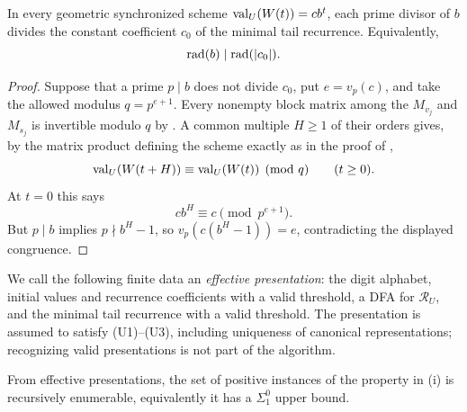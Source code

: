 \begin{lemma}
  \label{lem:geometric-ratio-tail-support}
  In every geometric synchronized scheme
  \(\operatorname{val}_U(W(t))=cb^t\), each prime divisor of \(b\) divides the
  constant coefficient \(c_0\) of the minimal tail recurrence.  Equivalently,
  \[
    \operatorname{rad}(b)\mid\operatorname{rad}(\lvert c_0 \rvert).
  \]
\end{lemma}

\begin{proof}
  Suppose that a prime \(p\mid b\) does not divide \(c_0\), put
  \(e=v_p(c)\), and take the allowed modulus \(q=p^{e+1}\).  Every
  nonempty block matrix among the \(M_{v_j}\) and \(M_{s_j}\) is invertible
  modulo \(q\) by .  A common
  multiple \(H\ge1\) of their orders gives, by the matrix product defining
  the scheme exactly as in the proof of
  ,
  \[
    \operatorname{val}_U(W(t+H))\equiv\operatorname{val}_U(W(t))\pmod q
    \qquad(t\ge0).
  \]
  At \(t=0\) this says
  \[
    cb^H\equiv c\pmod {p^{e+1}}.
  \]
  But \(p\mid b\) implies \(p\nmid b^H-1\), so
  \(v_p(c(b^H-1))=e\), contradicting the displayed congruence.
\end{proof}

We call the following finite data an \emph{effective presentation}: the
digit alphabet, initial values and recurrence coefficients with a valid
threshold, a DFA for \(\mathcal R_U\), and the minimal tail recurrence with
a valid threshold. The presentation is assumed to satisfy
\textup{(U1)}--\textup{(U3)}, including uniqueness of canonical
representations; recognizing valid presentations is not part of the
algorithm.

\begin{corollary}[Semidecidability]
  \label{cor:bounded-outside-support-semidecidable}
  From effective presentations, the set of positive instances of the property in
  \textup{(i)} is
  recursively enumerable, equivalently it has a \(\Sigma^0_1\) upper
  bound.
\end{corollary}

